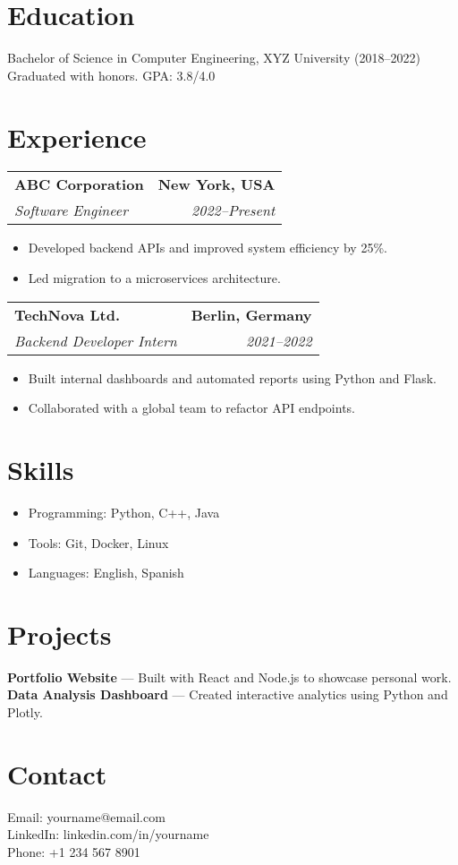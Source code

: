 \documentclass[a4paper,11pt]{article}
\makeatletter
\newcommand{\experience}[4]{%
  \noindent
  \begin{tabular*}{\textwidth}{@{\extracolsep{\fill}}lr}
    \textbf{#1} & \textbf{#2} \\[-0.1em] %
    \textit{#3} & \textit{#4} \\
  \end{tabular*}\vspace{0.15em} %
}
\makeatother
\begin{document}
\section{Education}
Bachelor of Science in Computer Engineering, XYZ University (2018–2022)\\
Graduated with honors. GPA: 3.8/4.0

\section{Experience}

\experience{ABC Corporation}{New York, USA}{Software Engineer}{2022–Present}
\begin{itemize}
  \item Developed backend APIs and improved system efficiency by 25\%.
  \item Led migration to a microservices architecture.
\end{itemize}

\experience{TechNova Ltd.}{Berlin, Germany}{Backend Developer Intern}{2021–2022}
\begin{itemize}
  \item Built internal dashboards and automated reports using Python and Flask.
  \item Collaborated with a global team to refactor API endpoints.
\end{itemize}

\section{Skills}
\begin{itemize}
  \item Programming: Python, C++, Java
  \item Tools: Git, Docker, Linux
  \item Languages: English, Spanish
\end{itemize}

\section{Projects}
\textbf{Portfolio Website} — Built with React and Node.js to showcase personal work.\\
\textbf{Data Analysis Dashboard} — Created interactive analytics using Python and Plotly.

\section{Contact}
Email: yourname@email.com\\
LinkedIn: linkedin.com/in/yourname\\
Phone: +1 234 567 8901
\end{document}
